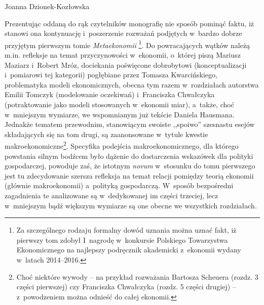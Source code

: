 \begin{recplenv}{Joanna Dzionek-Kozłowska}
\enlargethispage{-.5\baselineskip}

Prezentując oddaną do rąk czytelników monografię nie sposób pominąć faktu, iż stanowi ona kontynuację i~poszerzenie
rozważań podjętych w~bardzo dobrze przyjętym pierwszym tomie \textit{Metaekonomii}
\parencite{gorazda_metaekonomia:_2016}\footnote{Za szczególnego rodzaju formalny dowód uznania można uznać fakt, iż pierwszy tom zdobył
	I~nagrodę w~konkursie Polskiego Towarzystwa Ekonomicznego
	na najlepszy podręcznik akademicki z~ekonomii wydany w~latach 2014--2016.}.
Do powracających wątków należą m.in. refleksje na temat przyczynowości w~ekonomii, o~której piszą Mariusz
Maziarz i~Robert Mróz, dociekania poświęcone dobrobytowi (konceptualizacji i~pomiarowi tej kategorii)
pogłębiane przez Tomasza
Kwarcińskiego, problematyka modeli ekonomicznych, obecna tym razem w~rozdziałach autorstwa Emilii Tomczyk (modelowanie
oczekiwań) i~Franciszka Chwałczyka (potraktowanie jako modeli stosowanych w~ekonomii miar), a~także, choć w~mniejszym
wymiarze, we wspomnianym już tekście Daniela Hausmana. Jednakże tematem przewodnim, stanowiącym swoiste ,,spoiwo''
szesnastu esejów składających się na tom drugi, są zaanonsowane w~tytule kwestie makroekonomiczne\footnote{Choć niektóre
	wywody -- na przykład rozważania Bartosza Scheuera (rozdz. 3 części pierwszej) czy Franciszka Chwałczyka (rozdz. 5 części
drugiej) -- z~powodzeniem można odnieść do całej ekonomii.}. Specyfika podejścia makroekonomicznego, dla którego
powstania silnym bodźcem było dążenie do dostarczenia wskazówek dla polityki gospodarczej, powoduje zaś, że istotnym
\textit{novum} w~stosunku do tomu pierwszego jest tu zdecydowanie szersza refleksja na temat relacji pomiędzy teorią
ekonomii (głównie makroekonomii) a~polityką gospodarczą. W~sposób bezpośredni zagadnienia te analizowane
są w~dedykowanej im części trzeciej, lecz w~mniejszym bądź większym wymiarze są one obecne we wszystkich rozdziałach. 


\end{recplenv}
